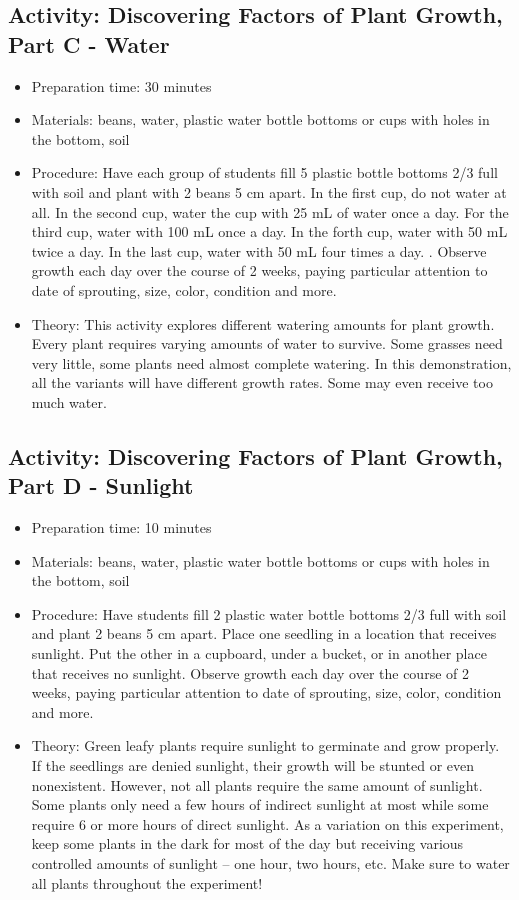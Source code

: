 \subsection{Activity: Discovering Factors of Plant Growth, Part C - Water}
\begin{itemize}
\item{Preparation time: 30 minutes}
\item{Materials: beans, water, plastic water bottle bottoms or cups with holes in the bottom, soil}
\item{Procedure: Have each group of students fill 5 plastic bottle bottoms 2/3 full with soil and plant with 2 beans 5 cm apart. In the first cup, do not water at all. In the second cup, water the cup with 25 mL of water once a day. For the third cup, water with 100 mL once a day. In the forth cup, water with 50 mL twice a day. In the last cup, water with 50 mL four times a day. . Observe growth each day over the course of 2 weeks, paying particular attention to date of sprouting, size, color, condition and more.}
\item{Theory: This activity explores different watering amounts for plant growth. Every plant requires varying amounts of water to survive. Some grasses need very little, some plants need almost complete watering. In this demonstration, all the variants will have different growth rates. Some may even receive too much water.}
\end{itemize}

\subsection{Activity: Discovering Factors of Plant Growth, Part D - Sunlight}
\begin{itemize}
\item{Preparation time: 10 minutes}
\item{Materials: beans, water, plastic water bottle bottoms or cups with holes in the bottom, soil}
\item{Procedure: Have students fill 2 plastic water bottle bottoms 2/3 full with soil and plant 2 beans 5 cm apart. Place one seedling in a location that receives sunlight. Put the other in a cupboard, under a bucket, or in another place that receives no sunlight. Observe growth each day over the course of 2 weeks, paying particular attention to date of sprouting, size, color, condition and more.}
\item{Theory: Green leafy plants require sunlight to germinate and grow properly. If the seedlings are denied sunlight, their growth will be stunted or even nonexistent. However, not all plants require the same amount of sunlight. Some plants only need a few hours of indirect sunlight at most while some require 6 or more hours of direct sunlight. As a variation on this experiment, keep some plants in the dark for most of the day but receiving various controlled amounts of sunlight – one hour, two hours, etc. Make sure to water all plants throughout the experiment!}
\end{itemize}

